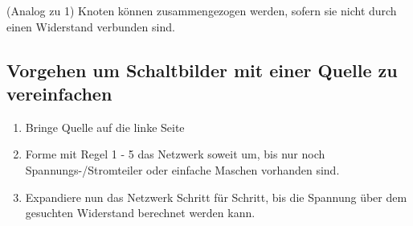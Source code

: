 					\iend
\fix \fix
					\beginip
						(Analog zu 1) Knoten können zusammengezogen werden, sofern sie nicht durch einen Widerstand verbunden sind.
						\begin{center}

						\end{center}
					\iend

					\newpage


					\subsection{Vorgehen um Schaltbilder mit einer Quelle zu vereinfachen}
					\begin{enumerate}
						\item Bringe Quelle auf die linke Seite
						\item Forme mit Regel 1 - 5 das Netzwerk soweit um, bis nur noch Spannungs-/Stromteiler oder einfache Maschen vorhanden sind.
						\item Expandiere nun das Netzwerk Schritt für Schritt, bis die Spannung über dem gesuchten Widerstand berechnet werden kann.
					\end{enumerate}

